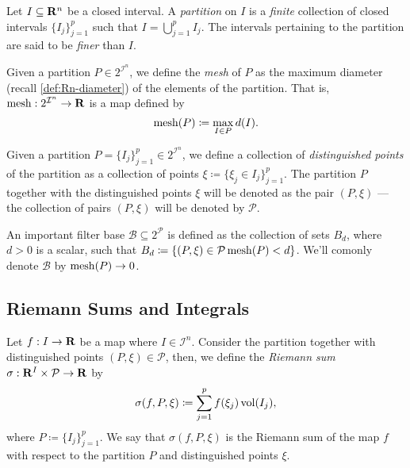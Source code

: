 \begin{definition}[Partition]
\label{def:interval-partition}
Let \(I \subseteq \mathbf{R}^n\) be a closed interval. A \emph{partition} on \(I\) is a
\emph{finite} collection of closed intervals \(\{I_{j}\}_{j=1}^p\) such that \(I
= \bigcup_{j=1}^p I_j\). The intervals pertaining to the partition are said to
be \emph{finer} than \(I\).
\end{definition}

\begin{definition}
\label{def:partition-mesh}
Given a partition \(P \in 2^{\mathcal I^n}\), we define the \emph{mesh} of \(P\)
as the maximum diameter (recall \cref{def:Rn-diameter}) of the elements of the
partition. That is, \(\operatorname{mesh}: 2^{\mathcal I^n} \to \mathbf{R}\) is a map defined by
\[
  \operatorname{mesh}(P) \coloneq \max_{I \in P} d(I).
\]
\end{definition}

\begin{definition}
\label{def:distinguished-points}
Given a partition \(P = \{I_{j}\}_{j=1}^p \in 2^{\mathcal I^n}\), we define a
collection of \emph{distinguished points} of the partition as a collection of
points \(\xi \coloneq \{\xi_j \in I_{j}\}_{j=1}^p\). The partition \(P\)
together with the distinguished points \(\xi\) will be denoted as the pair \((P,
\xi)\) --- the collection of pairs \((P, \xi)\) will be denoted by \(\mathcal
P\).
\end{definition}

An important filter base \(\mathcal B \subseteq 2^{\mathcal P}\) is
defined as the collection of sets \(B_d\), where \(d > 0\) is a scalar, such
that \(B_d \coloneq \{(P, \xi) \in \mathcal P \relax \operatorname{mesh}(P) < d\}\). We'll comonly
denote \(\mathcal B\) by \(\operatorname{mesh}(P) \to 0\).

\subsection{Riemann Sums and Integrals}

\begin{definition}
\label{def:riemann-sum}
Let \(f: I \to \mathbf{R}\) be a map where \(I \in \mathcal I^n\). Consider the
partition together with distinguished points \((P, \xi) \in \mathcal P\), then,
we define the \emph{Riemann sum} \(\sigma: \mathbf{R}^I \times \mathcal P \to \mathbf{R}\) by
\[
  \sigma(f, P, \xi) \coloneq \sum_{j=1}^p f(\xi_j) \operatorname{vol}(I_j),
\]
where \(P \coloneq \{I_{j}\}_{j=1}^p\). We say that \(\sigma(f, P, \xi)\) is the
Riemann sum of the map \(f\) with respect to the partition \(P\) and
distinguished points \(\xi\).
\end{definition}

